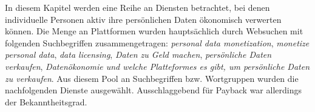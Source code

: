 In diesem Kapitel werden eine Reihe an Diensten betrachtet, bei denen individuelle Personen aktiv ihre persönlichen Daten ökonomisch verwerten können. Die Menge an Plattformen wurden hauptsächlich durch Websuchen mit folgenden Suchbegriffen zusammengetragen: \textit{personal data monetization}, \textit{monetize personal data}, \textit{data licensing}, \textit{Daten zu Geld machen}, \textit{persönliche Daten verkaufen}, \textit{Datenökonomie und welche Platteformes es gibt, um persönliche Daten zu verkaufen}. Aus diesem Pool an Suchbegriffen bzw. Wortgruppen wurden die nachfolgenden Dienste ausgewählt. Ausschlaggebend für Payback war allerdings der Bekanntheitsgrad.